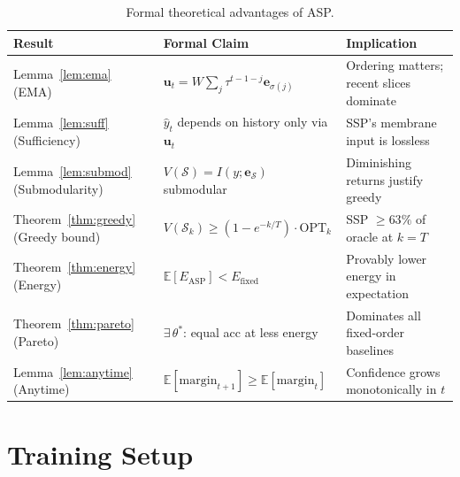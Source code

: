 \documentclass[11pt,a4paper]{article}
\begin{document}
\begin{table}[H]
\centering
\caption{Formal theoretical advantages of ASP.}
\label{tab:theory}
\begin{tabular}{p{3.2cm}p{5.0cm}p{4.5cm}}
\toprule
\textbf{Result} & \textbf{Formal Claim} & \textbf{Implication} \\
\midrule
Lemma~\ref{lem:ema} (EMA) &
  $\mathbf{u}_t=W\sum_j\tau^{t-1-j}\mathbf{e}_{\sigma(j)}$ &
  Ordering matters; recent slices dominate \\
Lemma~\ref{lem:suff} (Sufficiency) &
  $\hat{y}_t$ depends on history only via $\mathbf{u}_t$ &
  SSP's membrane input is lossless \\
Lemma~\ref{lem:submod} (Submodularity) &
  $V(\mathcal{S})=I(y;\mathbf{e}_\mathcal{S})$ submodular &
  Diminishing returns justify greedy \\
Theorem~\ref{thm:greedy} (Greedy bound) &
  $V(\mathcal{S}_k)\geq(1-e^{-k/T})\cdot\mathrm{OPT}_k$ &
  SSP $\geq 63\%$ of oracle at $k=T$ \\
Theorem~\ref{thm:energy} (Energy) &
  $\mathbb{E}[E_\mathrm{ASP}]<E_\mathrm{fixed}$ &
  Provably lower energy in expectation \\
Theorem~\ref{thm:pareto} (Pareto) &
  $\exists\,\theta^*$: equal acc at less energy &
  Dominates all fixed-order baselines \\
Lemma~\ref{lem:anytime} (Anytime) &
  $\mathbb{E}[\mathrm{margin}_{t+1}]\geq\mathbb{E}[\mathrm{margin}_t]$ &
  Confidence grows monotonically in $t$ \\
\bottomrule
\end{tabular}
\end{table}

\section{Training Setup}
\end{document}
